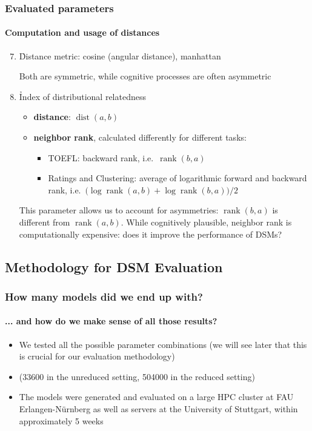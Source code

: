 \documentclass[t]{beamer} %
\begin{document}
\begin{frame}
  \frametitle{Evaluated parameters}
  \framesubtitle{Computation and usage of distances}   

  \begin{enumerate}
    \setcounter{enumi}{6}      
  \item   \h{Distance metric}: cosine (angular distance), manhattan
    \begin{block}{}\small
      Both are symmetric, while cognitive processes are often asymmetric
    \end{block}
    
  \item  \h{Index of distributional relatedness}
    \begin{itemize}
    \item \textbf{distance}: $\mathop{\text{dist}}(a,b)$
    \item  \textbf{neighbor rank}, calculated differently for different tasks:
      \begin{itemize}
      \item TOEFL: backward rank, i.e.\ $\mathop{\text{rank}}(b,a)$
      \item Ratings and Clustering: average of logarithmic forward and backward rank, i.e.\ $\bigl(\log \mathop{\text{rank}}(a,b) + \log \mathop{\text{rank}}(b,a)\bigr) / 2$
      \end{itemize}
    \end{itemize}    
    \begin{block}{}\small
      This parameter allows us to account for asymmetries: $\mathop{\text{rank}}(b,a)$ is different from $\mathop{\text{rank}}(a,b)$. While cognitively plausible, neighbor rank is computationally expensive: does it improve the performance of DSMs?
    \end{block}                
    
  \end{enumerate}   
\end{frame}

\subsection{Methodology for DSM Evaluation}

\begin{frame}
  \frametitle{How many models did we end up with?}
  \framesubtitle{... and how do we make sense of all those results?}   

  \begin{itemize}
  \item We tested all the possible parameter combinations (we will see later that this is crucial for our evaluation methodology)
  \item {} (33600 in the unreduced setting, 504000 in the reduced setting)
  \item The models were generated and evaluated on a large HPC cluster at FAU Erlangen-Nürnberg as well as servers at the University of Stuttgart, within approximately 5 weeks

  \end{itemize}
\end{frame}
\end{document}

